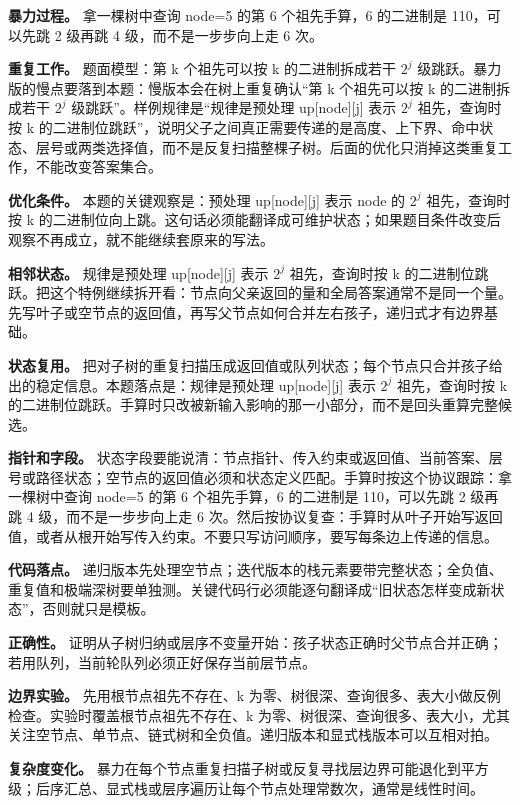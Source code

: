 \textbf{暴力过程。} 拿一棵树中查询 node=5 的第 6 个祖先手算，6 的二进制是 110，可以先跳 2 级再跳 4 级，而不是一步步向上走 6 次。

\textbf{重复工作。} 题面模型：第 k 个祖先可以按 k 的二进制拆成若干 \ensuremath{2^{j}} 级跳跃。暴力版的慢点要落到本题：慢版本会在树上重复确认“第 k 个祖先可以按 k 的二进制拆成若干 \ensuremath{2^{j}} 级跳跃”。样例规律是“规律是预处理 up[node][j] 表示 \ensuremath{2^{j}} 祖先，查询时按 k 的二进制位跳跃”，说明父子之间真正需要传递的是高度、上下界、命中状态、层号或两类选择值，而不是反复扫描整棵子树。后面的优化只消掉这类重复工作，不能改变答案集合。

\textbf{优化条件。} 本题的关键观察是：预处理 up[node][j] 表示 node 的 \ensuremath{2^{j}} 祖先，查询时按 k 的二进制位向上跳。这句话必须能翻译成可维护状态；如果题目条件改变后观察不再成立，就不能继续套原来的写法。

\textbf{相邻状态。} 规律是预处理 up[node][j] 表示 \ensuremath{2^{j}} 祖先，查询时按 k 的二进制位跳跃。把这个特例继续拆开看：节点向父亲返回的量和全局答案通常不是同一个量。先写叶子或空节点的返回值，再写父节点如何合并左右孩子，递归式才有边界基础。

\textbf{状态复用。} 把对子树的重复扫描压成返回值或队列状态；每个节点只合并孩子给出的稳定信息。本题落点是：规律是预处理 up[node][j] 表示 \ensuremath{2^{j}} 祖先，查询时按 k 的二进制位跳跃。手算时只改被新输入影响的那一小部分，而不是回头重算完整候选。

\textbf{指针和字段。} 状态字段要能说清：节点指针、传入约束或返回值、当前答案、层号或路径状态；空节点的返回值必须和状态定义匹配。手算时按这个协议跟踪：拿一棵树中查询 node=5 的第 6 个祖先手算，6 的二进制是 110，可以先跳 2 级再跳 4 级，而不是一步步向上走 6 次。然后按协议复查：手算时从叶子开始写返回值，或者从根开始写传入约束。不要只写访问顺序，要写每条边上传递的信息。

\textbf{代码落点。} 递归版本先处理空节点；迭代版本的栈元素要带完整状态；全负值、重复值和极端深树要单独测。关键代码行必须能逐句翻译成“旧状态怎样变成新状态”，否则就只是模板。

\textbf{正确性。} 证明从子树归纳或层序不变量开始：孩子状态正确时父节点合并正确；若用队列，当前轮队列必须正好保存当前层节点。

\textbf{边界实验。} 先用根节点祖先不存在、k 为零、树很深、查询很多、表大小做反例检查。实验时覆盖根节点祖先不存在、k 为零、树很深、查询很多、表大小，尤其关注空节点、单节点、链式树和全负值。递归版本和显式栈版本可以互相对拍。

\textbf{复杂度变化。} 暴力在每个节点重复扫描子树或反复寻找层边界可能退化到平方级；后序汇总、显式栈或层序遍历让每个节点处理常数次，通常是线性时间。

